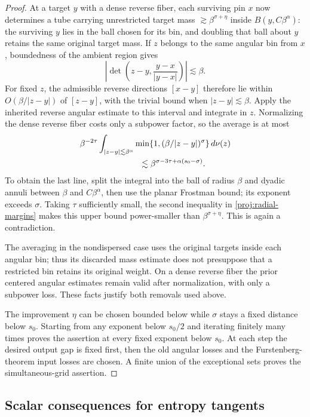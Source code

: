 \begin{proof}
At a target $y$ with a dense reverse fiber, each surviving pin $x$
now determines a tube carrying unrestricted target mass
$\gtrsim\beta^{\sigma+\eta}$ inside $B(y,C\beta^\alpha)$:
the surviving $y$ lies in the ball chosen for its bin, and doubling
that ball about $y$ retains the same original target mass. If $z$
belongs to the same angular bin from $x$, boundedness of the ambient
region gives
\[
 \left|\det\left(z-y,\frac{y-x}{|y-x|}\right)\right|
 \lesssim\beta.
\]
For fixed $z$, the admissible reverse directions $[x-y]$ therefore
lie within $O(\beta/|z-y|)$ of $[z-y]$, with the trivial bound
when $|z-y|\lesssim\beta$. Apply the inherited reverse angular
estimate to this interval and integrate in $z$. Normalizing the
dense reverse fiber costs only a subpower factor, so the average is
at most
\begin{align*}
 &\beta^{-2\tau}
 \int_{|z-y|\lesssim\beta^\alpha}
       \min\{1,(\beta/|z-y|)^\sigma\}\,d\nu(z)\\
 &\hspace{25mm}\lesssim
       \beta^{\sigma-3\tau+\alpha(s_0-\sigma)}.
\end{align*}
To obtain the last line, split the integral into the ball of radius
$\beta$ and dyadic annuli between $\beta$ and $C\beta^\alpha$,
then use the planar Frostman bound; its exponent exceeds $\sigma$.
Taking $\tau$ sufficiently small, the second inequality in
\eqref{proj:radial-margins} makes this upper bound power-smaller than
$\beta^{\sigma+\eta}$. This is again a contradiction.

The averaging in the nondispersed case uses the original targets
inside each angular bin; thus its discarded mass estimate does not
presuppose that a restricted bin retains its original weight. On a
dense reverse fiber the prior centered angular estimates remain
valid after normalization, with only a subpower loss. These facts
justify both removals used above.

The improvement $\eta$ can be chosen bounded below while $\sigma$
stays a fixed distance below $s_0$. Starting from any exponent below
$s_0/2$ and iterating finitely many times proves the assertion at
every fixed exponent below $s_0$. At each step the desired output
gap is fixed first, then the old angular losses and the
Furstenberg-theorem input losses are chosen. A finite union of the
exceptional sets proves the simultaneous-grid assertion.
\end{proof}

\subsection{Scalar consequences for entropy tangents}

